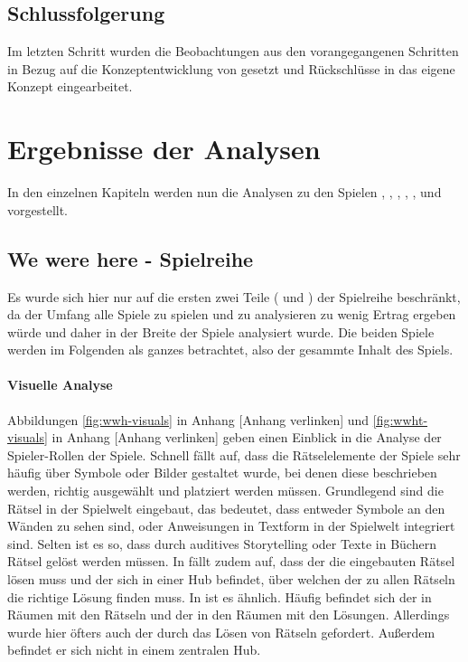 \subsection{Schlussfolgerung}
Im letzten Schritt wurden die Beobachtungen aus den vorangegangenen Schritten in Bezug auf die Konzeptentwicklung von  gesetzt und Rückschlüsse in das eigene Konzept eingearbeitet.

\section{Ergebnisse der Analysen}
In den einzelnen Kapiteln werden nun die Analysen zu den Spielen , , , , ,  und  vorgestellt.

\subsection{We were here - Spielreihe}
Es wurde sich hier nur auf die ersten zwei Teile ( und ) der Spielreihe beschränkt, da der Umfang alle Spiele zu spielen und zu analysieren zu wenig Ertrag ergeben würde und daher in der Breite der Spiele analysiert wurde. Die beiden Spiele werden im Folgenden als ganzes betrachtet, also der gesammte Inhalt des Spiels.

\paragraph{Visuelle Analyse}
Abbildungen \ref{fig:wwh-visuals} in Anhang [Anhang verlinken] und \ref{fig:wwht-visuals} in Anhang [Anhang verlinken] geben einen Einblick in die Analyse der Spieler-Rollen der Spiele. Schnell fällt auf, dass die Rätselelemente der Spiele sehr häufig über Symbole oder Bilder gestaltet wurde, bei denen diese beschrieben werden, richtig ausgewählt und platziert werden müssen. Grundlegend sind die Rätsel in der Spielwelt eingebaut, das bedeutet, dass entweder Symbole an den Wänden zu sehen sind, oder Anweisungen in Textform in der Spielwelt integriert sind. Selten ist es so, dass durch auditives Storytelling oder Texte in Büchern Rätsel gelöst werden müssen. In  fällt zudem auf, dass der  die eingebauten Rätsel lösen muss und der  sich in einer Hub befindet, über welchen der zu allen Rätseln die richtige Lösung finden muss. In  ist es ähnlich. Häufig befindet sich der  in Räumen mit den Rätseln und der  in den Räumen mit den Lösungen. Allerdings wurde hier öfters auch der  durch das Lösen von Rätseln gefordert. Außerdem befindet er sich nicht in einem zentralen Hub.

